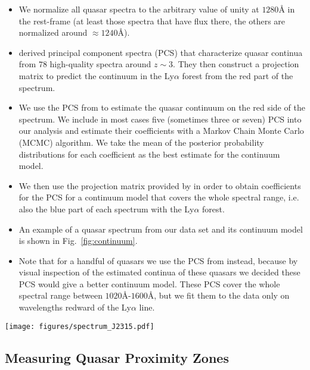 \documentclass[iop]{emulateapj}
\newcommand{\lya} {Ly$\alpha$\xspace}
\begin{document}
\begin{itemize}
\item We normalize all quasar spectra to the arbitrary value of unity at $1280${\AA} in the rest-frame (at least those spectra that have flux there, the others are normalized around $\approx 1240${\AA}). 
\item \citet{Paris2011} derived principal component spectra (PCS) that characterize quasar continua from $78$ high-quality spectra around $z\sim 3$. They then construct a projection matrix to predict the continuum in the \lya forest from the red part of the spectrum. 
\item We use the PCS from \citet{Paris2011} to estimate the quasar continuum on the red side of the spectrum. We include in most cases five (sometimes three or seven) PCS into our analysis and estimate their coefficients with a Markov Chain Monte Carlo (MCMC) algorithm. We take the mean of the posterior probability distributions for each coefficient as the best estimate for the continuum model. 
\item We then use the projection matrix provided by \citet{Paris2011} in order to obtain coefficients for the PCS for a continuum model that covers the whole spectral range, i.e. also the blue part of each spectrum with the \lya forest. 
\item An example of a quasar spectrum from our data set and its continuum model is shown in Fig.~\ref{fig:continuum}. 
\item Note that for a handful of quasars we use the PCS from \citet{Suzuki2006} instead, because by visual inspection of the estimated continua of these quasars we decided these PCS would give a better continuum model. These PCS cover the whole spectral range between $1020${\AA}-$1600${\AA}, but we fit them to the data only on wavelengths redward of the \lya line. 
\end{itemize}


\begin{figure*}[t]
\centering
\texttt{[image: figures/spectrum\_J2315.pdf]}
\caption{Example of a quasar spectrum and its continuum model. The continuum is fitted to the data with five PCS from \citet{Paris2011} on the red wavelength side of the spectrum, i.e. $\lambda > 1216${\AA}, and then projected onto the blue wavelength side, i.e. $\lambda < 1216${\AA}, in order to predict the continuum in the \lya forest region. \label{fig:continuum}} 
\end{figure*}


\subsection{Measuring Quasar Proximity Zones}\label{sec:measure_prox_zones}
\end{document}
